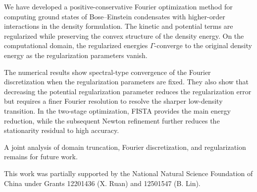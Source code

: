 \documentclass[11pt]{article}
\theoremstyle{plain}
\theoremstyle{definition}
\numberwithin{equation}{section}
\begin{document}
%


We have developed a positive-conservative Fourier optimization method
for computing ground states of Bose--Einstein condensates with
higher-order interactions in the density formulation. The kinetic and
potential terms are regularized while preserving the convex structure
of the density energy. On the computational domain, the regularized
energies $\Gamma$-converge to the original density energy as the
regularization parameters vanish.

The numerical results show spectral-type convergence of the Fourier
discretization when the regularization parameters are fixed. 
They also show
that decreasing the potential regularization parameter reduces the
regularization error but requires a finer Fourier resolution to resolve
the sharper low-density transition. In the two-stage optimization,
FISTA provides the main energy reduction, while the subsequent Newton
refinement further reduces the stationarity residual to high accuracy.

A joint analysis of domain truncation, Fourier discretization, and
regularization remains for future work.



\bigskip
{} 
This work was partially supported by the National Natural Science
Foundation of China under Grants 12201436 (X. Ruan) and 12501547 (B. Lin).


\appendix
\end{document}
